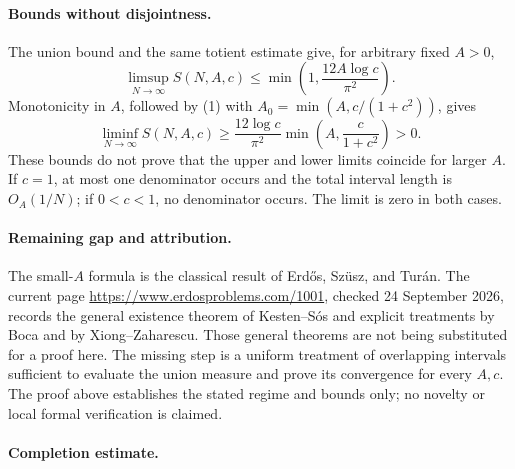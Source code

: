 \paragraph{Bounds without disjointness.}
The union bound and the same totient estimate give, for arbitrary fixed \(A>0\),
\[
 \limsup_{N\to\infty}S(N,A,c)
 \leq\min\left(1,\frac{12A\log c}{\pi^2}\right).
\]
Monotonicity in \(A\), followed by (1) with
\(A_0=\min(A,c/(1+c^2))\), gives
\[
 \liminf_{N\to\infty}S(N,A,c)
 \geq\frac{12\log c}{\pi^2}
          \min\left(A,\frac{c}{1+c^2}\right)>0.
\]
These bounds do not prove that the upper and lower limits coincide for larger \(A\). If \(c=1\), at most one denominator occurs and the total interval length is \(O_A(1/N)\); if \(0<c<1\), no denominator occurs. The limit is zero in both cases.

\paragraph{Remaining gap and attribution.}
The small-\(A\) formula is the classical result of Erd\H{o}s, Sz\"usz, and Tur\'an. The current page \url{https://www.erdosproblems.com/1001}, checked 24 September 2026, records the general existence theorem of Kesten--S\'os and explicit treatments by Boca and by Xiong--Zaharescu. Those general theorems are not being substituted for a proof here. The missing step is a uniform treatment of overlapping intervals sufficient to evaluate the union measure and prove its convergence for every \(A,c\). The proof above establishes the stated regime and bounds only; no novelty or local formal verification is claimed.

\paragraph{Completion estimate.}
